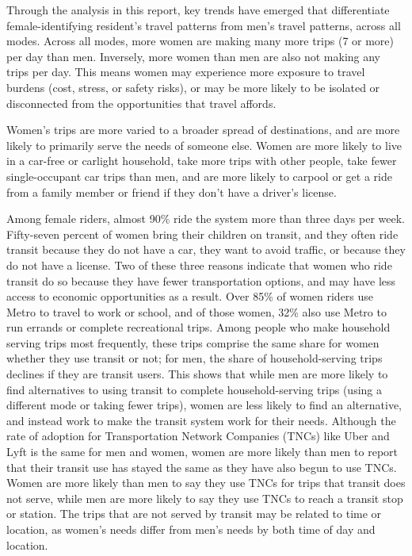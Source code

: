 \documentclass[
  12pt,
]{article}
\begin{document}
\begin{flushleft}
Through the analysis in this report, key trends have emerged that differentiate female-identifying resident’s travel patterns from men’s travel patterns, across all modes. Across all modes, more women are making many more trips (7 or more) per day than men. Inversely, more women than men are also not making any trips per day. This means women may experience more exposure to travel burdens (cost, stress, or safety risks), or may be more likely to be isolated or disconnected from the opportunities that travel affords.

Women’s trips are more varied to a broader spread of destinations, and are more likely to primarily serve the needs of someone else. Women are more likely to live in a car-free or carlight household, take more trips with other people, take fewer single-occupant car trips than men, and are more likely to carpool or get a ride from a family member or friend if they don’t have a driver’s license.

Among female riders, almost 90\% ride the system more than three days per week. Fifty-seven percent of women bring their children on transit, and they often ride transit because they do not have a car, they want to avoid traffic, or because they do not have a license. Two of these three reasons indicate that women who ride transit do so because they have fewer transportation options, and may have less access to economic opportunities as a result. Over 85\% of women riders use Metro to travel to work or school, and of those women, 32\% also use Metro to run errands or complete recreational trips. Among people who make household serving trips most frequently, these trips comprise the same share for women whether they use transit or not; for men, the share of household-serving trips declines if they are transit users. This shows that while men are more likely to find alternatives to using transit to complete household-serving trips (using a different mode or taking fewer trips), women are less likely to find an alternative, and instead work to make the transit system work for their needs. Although the rate of adoption for Transportation Network Companies (TNCs) like Uber and Lyft is the same for men and women, women are more likely than men to report that their transit use has stayed the same as they have also begun to use TNCs. Women are more likely than men to say they use TNCs for trips that transit does not serve, while men are more likely to say they use TNCs to reach a transit stop or station. The trips that are not served by transit may be related to time or location, as women’s needs differ from men’s needs by both time of day and location.
\end{flushleft}
\end{document}
